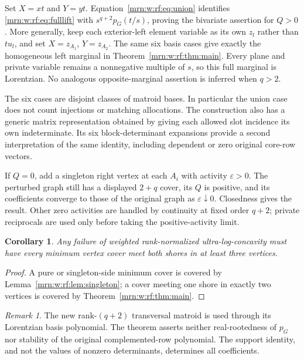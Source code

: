 \documentclass[11pt,a4paper]{article}
\newtheorem{corollary}[theorem]{Corollary}
\theoremstyle{remark}\newtheorem{remark}[theorem]{Remark}
\begin{document}
Set $X=xt$ and $Y=yt$. Equation~\eqref{mrn:w:rf:eq:union} identifies \eqref{mrn:w:rf:eq:fulllift} with $s^{q+2}p_G(t/s)$, proving the bivariate assertion for $Q>0$. More generally, keep each exterior-left element variable as its own $z_l$ rather than $tu_l$, and set $X=z_{A_1}$, $Y=z_{A_2}$. The same six basis cases give exactly the homogeneous left marginal in Theorem~\ref{mrn:w:rf:thm:main}. Every plane and private variable remains a nonnegative multiple of $s$, so this full marginal is Lorentzian. No analogous opposite-marginal assertion is inferred when $q>2$.

The six cases are disjoint classes of matroid bases. In particular the union case does not count injections or matching allocations. The construction also has a generic matrix representation obtained by giving each allowed slot incidence its own indeterminate. Its six block-determinant expansions provide a second interpretation of the same identity, including dependent or zero original core-row vectors.

If $Q=0$, add a singleton right vertex at each $A_i$ with activity $\varepsilon>0$. The perturbed graph still has a displayed $2+q$ cover, its $Q$ is positive, and its coefficients converge to those of the original graph as $\varepsilon\downarrow0$. Closedness gives the result. Other zero activities are handled by continuity at fixed order $q+2$; private reciprocals are used only before taking the positive-activity limit.

\begin{corollary}\label{mrn:w:rf:cor:coverobstruction}
Any failure of weighted rank-normalized ultra-log-concavity must have every minimum vertex cover meet both shores in at least three vertices.
\end{corollary}
\begin{proof}
A pure or singleton-side minimum cover is covered by Lemma~\ref{mrn:w:rf:lem:singleton}; a cover meeting one shore in exactly two vertices is covered by Theorem~\ref{mrn:w:rf:thm:main}.
\end{proof}

\begin{remark}
The new rank-$(q+2)$ transversal matroid is used through its Lorentzian basis polynomial. The theorem asserts neither real-rootedness of $p_G$ nor stability of the original complemented-row polynomial. The support identity, and not the values of nonzero determinants, determines all coefficients.
\end{remark}
\end{document}
